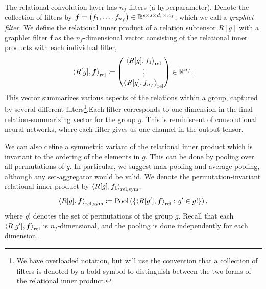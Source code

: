 The relational convolution layer has $n_f$ filters (a hyperparameter). Denote the collection of filters by $\boldsymbol{f} = \left(f_1, \ldots, f_{n_f}\right) \in \mathbb{R}^{s \times s \times d_r \times n_f}$, which we call a \textit{graphlet filter}. We define the relational inner product of a relation subtensor $R[g]$ with a graphlet filter $\bm{f}$ as the $n_f$-dimensional vector consisting of the relational inner products with each individual filter,
\begin{equation}
    \label{eq:relational_inner_prod}
    \left\langle R[g], \bm{f} \right\rangle_\mathrm{rel} \coloneq \begin{pmatrix} \left\langle R[g], f_1 \right\rangle_\mathrm{rel} \\ \vdots 
 \\ \left\langle R[g], f_{n_f} \right\rangle_\mathrm{rel} \end{pmatrix} \in \mathbb{R}^{n_f}.
\end{equation}
This vector summarizes various aspects of the relations within a group, captured by several different filters\footnote{We have overloaded notation, but will use the convention that a collection of filters is denoted by a bold symbol to distinguish between the two forms of the relational inner product.}.Each filter corresponds to one dimension in the final relation-summarizing vector for the group $g$. This is reminiscent of convolutional neural networks, where each filter gives us one channel in the output tensor.

We can also define a symmetric variant of the relational inner product which is invariant to the ordering of the elements in $g$. This can be done by pooling over all permutations of $g$. In particular, we suggest max-pooling and average-pooling, although any set-aggregator would be valid. We denote the permutation-invariant relational inner product by $\left \langle R[g], f_1 \right\rangle_{\mathrm{rel}, \mathrm{sym}}$,
\begin{equation}\label{eq:symmetric_relational_inner_prod}
    \left \langle R[g], \bm{f} \right\rangle_{\mathrm{rel}, \mathrm{sym}} \coloneq \mathrm{Pool}\left(\left\{\left\langle R[g'], \bm{f} \right\rangle_\mathrm{rel} \colon g' \in g!\right\}\right),
\end{equation}
\noindent where $g!$ denotes the set of permutations of the group $g$. Recall that each $\left \langle R[g'], \bm{f} \right\rangle_{\mathrm{rel}}$ is $n_f$-dimensional, and the pooling is done independently for each dimension.

